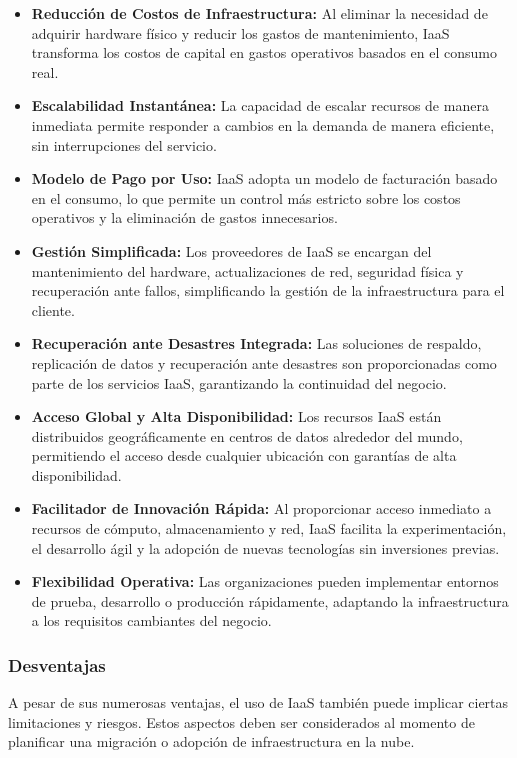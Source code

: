 {                \begin{itemize}
                    \item \textbf{Reducción de Costos de Infraestructura:} Al eliminar la necesidad de adquirir hardware físico y reducir los gastos de mantenimiento, IaaS transforma los costos de capital en gastos operativos basados en el consumo real.
                    \item \textbf{Escalabilidad Instantánea:} La capacidad de escalar recursos de manera inmediata permite responder a cambios en la demanda de manera eficiente, sin interrupciones del servicio.
                    \item \textbf{Modelo de Pago por Uso:} IaaS adopta un modelo de facturación basado en el consumo, lo que permite un control más estricto sobre los costos operativos y la eliminación de gastos innecesarios.
                    \item \textbf{Gestión Simplificada:} Los proveedores de IaaS se encargan del mantenimiento del hardware, actualizaciones de red, seguridad física y recuperación ante fallos, simplificando la gestión de la infraestructura para el cliente.
                    \item \textbf{Recuperación ante Desastres Integrada:} Las soluciones de respaldo, replicación de datos y recuperación ante desastres son proporcionadas como parte de los servicios IaaS, garantizando la continuidad del negocio.
                    \item \textbf{Acceso Global y Alta Disponibilidad:} Los recursos IaaS están distribuidos geográficamente en centros de datos alrededor del mundo, permitiendo el acceso desde cualquier ubicación con garantías de alta disponibilidad.
                    \item \textbf{Facilitador de Innovación Rápida:} Al proporcionar acceso inmediato a recursos de cómputo, almacenamiento y red, IaaS facilita la experimentación, el desarrollo ágil y la adopción de nuevas tecnologías sin inversiones previas.
                    \item \textbf{Flexibilidad Operativa:} Las organizaciones pueden implementar entornos de prueba, desarrollo o producción rápidamente, adaptando la infraestructura a los requisitos cambiantes del negocio.
                \end{itemize}
            \subsubsection{Desventajas}
                A pesar de sus numerosas ventajas, el uso de IaaS también puede implicar ciertas limitaciones y riesgos. Estos aspectos deben ser considerados al momento de planificar una migración o adopción de infraestructura en la nube.
                
}
